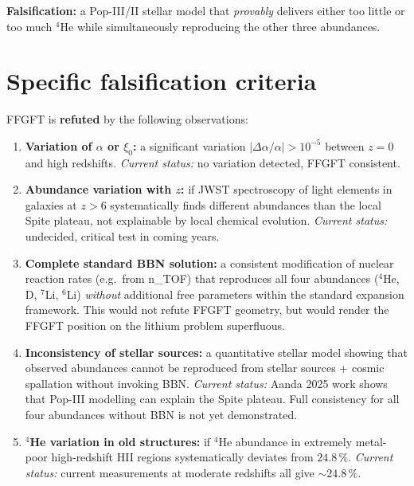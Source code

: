 \textbf{Falsification:} a Pop-III/II stellar model that
\emph{provably} delivers either too little or too much $^4$He while
simultaneously reproducing the other three abundances.

\section{Specific falsification criteria}

FFGFT is \textbf{refuted} by the following observations:

\begin{enumerate}[leftmargin=2em,itemsep=4pt,topsep=2pt]
  \item \textbf{Variation of $\alpha$ or $\xi_0$:}
        a significant variation $|\Delta\alpha/\alpha| > 10^{-5}$
        between $z = 0$ and high redshifts.
        \emph{Current status:} no variation detected, FFGFT
        consistent.

  \item \textbf{Abundance variation with $z$:}
        if JWST spectroscopy of light elements in galaxies at $z > 6$
        systematically finds different abundances than the local
        Spite plateau, not explainable by local chemical evolution.
        \emph{Current status:} undecided, critical test in coming
        years.

  \item \textbf{Complete standard BBN solution:}
        a consistent modification of nuclear reaction rates (e.g.\
        from n\_TOF) that reproduces all four abundances ($^4$He, D,
        $^7$Li, $^6$Li) \emph{without} additional free parameters
        within the standard expansion framework. This would not
        refute FFGFT geometry, but would render the FFGFT position
        on the lithium problem superfluous.

  \item \textbf{Inconsistency of stellar sources:}
        a quantitative stellar model showing that observed
        abundances cannot be reproduced from stellar sources +
        cosmic spallation without invoking BBN.
        \emph{Current status:} Aanda 2025 work shows that Pop-III
        modelling can explain the Spite plateau. Full consistency
        for all four abundances without BBN is not yet demonstrated.

  \item \textbf{$^4$He variation in old structures:}
        if $^4$He abundance in extremely metal-poor high-redshift
        HII regions systematically deviates from $24.8\,\%$.
        \emph{Current status:} current measurements at moderate
        redshifts all give $\sim 24.8\,\%$.
\end{enumerate}

